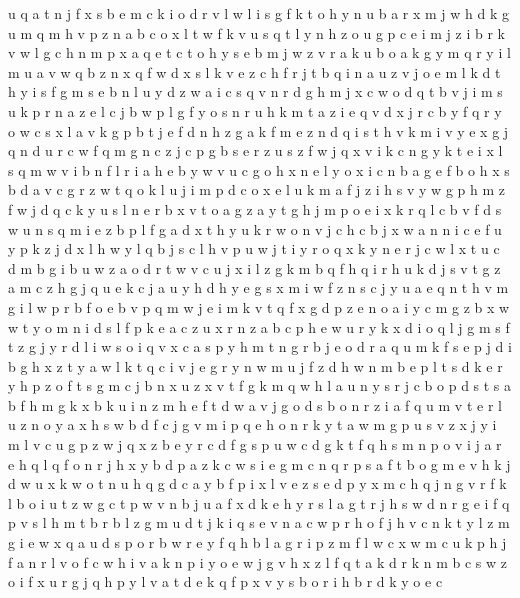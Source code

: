 \documentclass{article}
\begin{document}
u q a t n j f x s b e m c k i o d r v l w
l i s g f k t o h y n u b a r x m j w
h
d k g u m q
m h v
p z n a b c o x l t w f k v u
s q t l y n h z o u g p c e i m
j z i b r k v w l g c h n m p x a q e t
c t o h y s e b m j w z v r a k u
b o a k g y m q
r y i l m u a v w q
b z n x q f
w d x s l k v e z c h f r j t b q i
n a u z v j o e m l k d t h y i s f
g m s e b n l u y d z w a i c
s q v n r d g h m j
x c w o d q t b v j i m s u k p r n a z e l
c j b w p l g f y o s n r u h k m t a z i e q v d x
j r c b y f
q r y o w c s x l a v k g p b t j e f d n h z
g a k f m e z n d q i s t h v
k m i v y e x g j q n d u r c w f
q m g n c z j
c p g b s e
r z u s
z f w j q x v i k c n
g y k t e i x l s q
m w v i b n
f l
r i a h e b y w v u c g
o h x n e l
y o x i c n b a g
e f b o
h x s b d a v c g r z w t q o k l u j i m
p d c o x e l u k m a f j z i h s v y w g
p h m z f w j d q c k y u s l n e r b x v t o a g
z a
y t g h j m p o e i x k r q l c b v f d s w u n
s q m i e z b p l f g a d x t h y u k r w o n v j c
h c b j x w a n
n i c e f u y p k z j d x l h w
y l q b j
s c l h v p u w j t i y r o q x k
y n e r j c w
l x t u c d m b g
i b
u w z
a o d r t w v c u j x i l z g k m b q f h
q i r h u k d j s v t g z a m c
z h g j q u
e k c j a u y h d
h y e g s x m i w f z n
s c j y u a e q n t h v m g i l w p r b f o
e
b v p q m w j
e i m k v t q f x g d p z
e n o a i y c m g z b x w
w t y o m n i d s l f p k e a c z u x r
n z a b c p h e w u r y k x d i o q l j g m s f t
z g j y r d l i w s o
i q v x c a s p y h m t n g r b j e o d
r a q u m k f s e p j d i b g h x z t y
a w l k t q c i v
j e g r y n w m
u j f z d h w n m b e p l t s
d k e r y h p z o f t s g m c j b n x
u
z x v t f g k m q w h l a u n y s r j c b o p d
s t
s a b f h m g k x
b k u i n z m h e f t d w a v j g o
d s b o n r z i a f q u m v t
e r l u z n o y a x h s w b d f c j g v m i p q
e h o n r k y t a w m g p u s v z x j
y i m l v c u g p z
w j q x z b e y r c d f g s p
u w c d g k t f q h s m n p o v i j a r e
h q
l q f o n r j h x y b d p a z k c w s i e g m
c n q r p s a f t b o g m e v h k j d w u x
k w o t n u h q g d c a y b f p i x l v e z
s e d p y x m c h q j n g v r f k l b o i u t z w
g c t p w v n b j u a f x d k e h y
r s l
a g t r j h s w d
n r
g e i f q p v s l h m t b r
b l z g m u d t j k i q s e v n a c w p r h o f
j h v c n k t y l z m g i e w x q a u d s p o r b
w r e y f q h b l
a g r i p z m f l w c
x w m c u k p h j f a n r l v o
f c w h i v a k
n p i y o e w j g v h x z l f q t a k d r
k n m b c s w z o i f x u r g j q h p y l v a t d e
k
q f p x v y s b o r
i h b r d k y o e c
\end{document}
